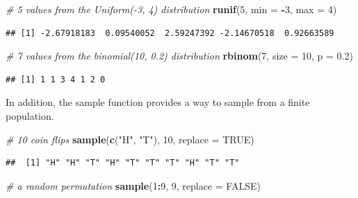 \documentclass[]{article}
\newenvironment{Shaded}{\begin{snugshade}}{\end{snugshade}}
\newcommand{\KeywordTok}[1]{\textcolor[rgb]{0.13,0.29,0.53}{\textbf{#1}}}
\newcommand{\DataTypeTok}[1]{\textcolor[rgb]{0.13,0.29,0.53}{#1}}
\newcommand{\DecValTok}[1]{\textcolor[rgb]{0.00,0.00,0.81}{#1}}
\newcommand{\FloatTok}[1]{\textcolor[rgb]{0.00,0.00,0.81}{#1}}
\newcommand{\StringTok}[1]{\textcolor[rgb]{0.31,0.60,0.02}{#1}}
\newcommand{\CommentTok}[1]{\textcolor[rgb]{0.56,0.35,0.01}{\textit{#1}}}
\newcommand{\OtherTok}[1]{\textcolor[rgb]{0.56,0.35,0.01}{#1}}
\newcommand{\OperatorTok}[1]{\textcolor[rgb]{0.81,0.36,0.00}{\textbf{#1}}}
\newcommand{\NormalTok}[1]{#1}
\begin{document}
\begin{Shaded}
\begin{Highlighting}[]
\CommentTok{# 5 values from the Uniform(-3, 4) distribution}
\KeywordTok{runif}\NormalTok{(}\DecValTok{5}\NormalTok{, }\DataTypeTok{min =} \OperatorTok{-}\DecValTok{3}\NormalTok{, }\DataTypeTok{max =} \DecValTok{4}\NormalTok{)}
\end{Highlighting}
\end{Shaded}

\begin{verbatim}
## [1] -2.67918183  0.09540052  2.59247392 -2.14670518  0.92663589
\end{verbatim}

\begin{Shaded}
\begin{Highlighting}[]
\CommentTok{# 7 values from the binomial(10, 0.2) distribution}
\KeywordTok{rbinom}\NormalTok{(}\DecValTok{7}\NormalTok{, }\DataTypeTok{size =} \DecValTok{10}\NormalTok{, }\DataTypeTok{p =} \FloatTok{0.2}\NormalTok{)}
\end{Highlighting}
\end{Shaded}

\begin{verbatim}
## [1] 1 1 3 4 1 2 0
\end{verbatim}

In addition, the sample function provides a way to sample from a finite
population.

\begin{Shaded}
\begin{Highlighting}[]
\CommentTok{# 10 coin flips}
\KeywordTok{sample}\NormalTok{(}\KeywordTok{c}\NormalTok{(}\StringTok{"H"}\NormalTok{, }\StringTok{"T"}\NormalTok{), }\DecValTok{10}\NormalTok{, }\DataTypeTok{replace =} \OtherTok{TRUE}\NormalTok{)}
\end{Highlighting}
\end{Shaded}

\begin{verbatim}
##  [1] "H" "H" "T" "H" "T" "T" "T" "H" "T" "T"
\end{verbatim}

\begin{Shaded}
\begin{Highlighting}[]
\CommentTok{# a random permutation}
\KeywordTok{sample}\NormalTok{(}\DecValTok{1}\OperatorTok{:}\DecValTok{9}\NormalTok{, }\DecValTok{9}\NormalTok{, }\DataTypeTok{replace =} \OtherTok{FALSE}\NormalTok{)}
\end{Highlighting}
\end{Shaded}
\end{document}
